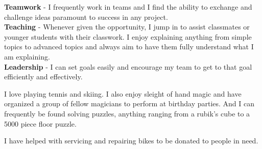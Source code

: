 \documentclass[8pt]{developercv} %
\begin{document}

\begin{minipage}[t]{0.3\textwidth}
	\vspace{-\baselineskip} %

	
	\textbf{Teamwork} - I frequently work in teams and I find the ability to exchange and challenge ideas paramount to success in any project. \\
	\textbf{Teaching} - Whenever given the opportunity, I jump in to assist classmates or younger students with their classwork. I enjoy explaining anything from simple topics to advanced topics and always aim to have them fully understand what I am explaining. \\
	\textbf{Leadership} - I can set goals easily and encourage my team to get to that goal efficiently and effectively. 
\end{minipage}
\hfill
\begin{minipage}[t]{0.3\textwidth}
	\vspace{-\baselineskip} %
	
	
	I love playing tennis and skiing. I also enjoy sleight of hand magic and have organized a group of fellow magicians to perform at birthday parties.
	And I can frequently be found solving puzzles, anything ranging from a rubik's cube to a 5000 piece floor puzzle.  
\end{minipage}
\hfill
\begin{minipage}[t]{0.3\textwidth}
	\vspace{-\baselineskip} %
	
	
	I have helped with servicing and repairing bikes to be donated to people in need.
\end{minipage}

\end{document}
